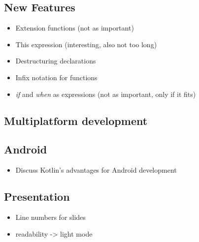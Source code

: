 \documentclass[a4paper, 11pt]{article}
\begin{document}
  \subsection{New Features}
    \begin{itemize}
      \item Extension functions (not as important)
      \item This expression (interesting, also not too long)
      \item Destructuring declarations
      \item Infix notation for functions
      \item \textit{if} and \textit{when} as expressions (not as important, only if it fits)
    \end{itemize}

  \subsection{Multiplatform development}
  
  \subsection{Android}
    \begin{itemize}
      \item Discuss Kotlin's advantages for Android development
    \end{itemize}

  \subsection{Presentation}
  \begin{itemize}
    \item Line numbers for slides
    \item readability -> light mode
  \end{itemize}
\end{document}
